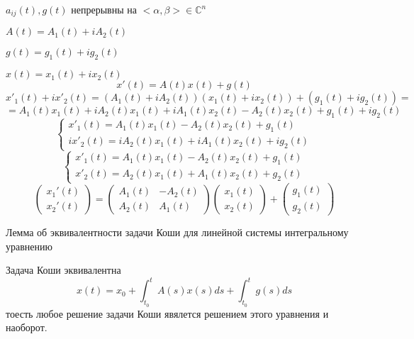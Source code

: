 \begin{block}
  $a_{ij}(t), g(t)$ непрерывны на $<\alpha, \beta> \in \mathbb{C}^n$

  $A(t) = A_1(t) + iA_2(t)$

  $g(t) = g_1(t) + ig_2(t)$

  $x(t) = x_1(t) + ix_2(t)$
  $$
  x'(t) = A(t)x(t) + g(t)
  $$
  $$
  x'_1(t) + ix'_2(t) = (A_1(t) + iA_2(t)) (x_1(t) + ix_2(t)) +
  (g_1(t) + ig_2(t)) =
  $$
  $$
  = A_1(t)x_1(t) + iA_2(t)x_1(t) + iA_1(t)x_2(t) - A_2(t)x_2(t) +
  g_1(t) + ig_2(t)
  $$
  $$
  \left\{
  \begin{array}{l}
    x'_1(t) = A_1(t)x_1(t) - A_2(t)x_2(t) + g_1(t) \\
    ix'_2(t) = iA_2(t)x_1(t) + iA_1(t)x_2(t) + ig_2(t)
  \end{array}
  \right.
  $$
  $$
  \left\{
  \begin{array}{l}
    x'_1(t) = A_1(t)x_1(t) - A_2(t)x_2(t) + g_1(t) \\
    x'_2(t) = A_2(t)x_1(t) + A_1(t)x_2(t) + g_2(t)
  \end{array}
  \right.
  $$
  $$
  \left(
  \begin{array}{c}
    x_1'(t) \\
    x_2'(t)
  \end{array}
  \right) =
  \left(
  \begin{array}{cc}
    A_1(t) & -A_2(t) \\
    A_2(t) & A_1(t)
  \end{array}
  \right)
  \left(
  \begin{array}{c}
    x_1(t) \\
    x_2(t)
  \end{array}
  \right) +
  \left(
  \begin{array}{c}
    g_1(t) \\
    g_2(t)
  \end{array}
  \right)
  $$
\end{block}

\begin{title}[\Large]
  Лемма об эквивалентности задачи Коши для линейной системы интегральному
  уравнению
\end{title}

\begin{block}
  Задача Коши эквивалентна
  $$
  x(t) = x_0 + \int_{t_0}^t A(s)x(s)ds +
  \int_{t_0}^t g(s)ds
  $$
  тоесть любое решение задачи Коши явялется решением этого уравнения и наоборот.
\end{block}

